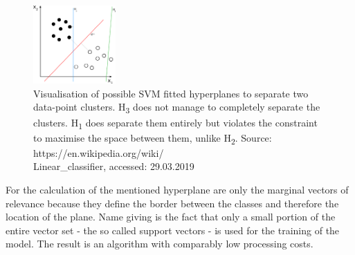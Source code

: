 \begin{figure} %
    \centerline{\includegraphics[trim={0 0 0 0},clip,width=0.28\textwidth]{img/Svm_separating_hyperplanes}}
  \caption{Visualisation of possible SVM fitted hyperplanes to separate two data-point clusters. H\textsubscript{3} does not manage to completely separate the clusters. H\textsubscript{1} does separate them entirely but violates the constraint to maximise the space between them, unlike H\textsubscript{2}. Source: https://en.wikipedia.org/wiki/ \\ Linear\_classifier, accessed: 29.03.2019}
  \label{fig:SVM_visualisation}
\vspace{-0.5cm}
\end{figure}

For the calculation of the mentioned hyperplane are only the marginal vectors of relevance because they define the border between the classes and therefore the location of the plane. Name giving is the fact that only a small portion of the entire vector set - the so called support vectors - is used for the training of the model. The result is an algorithm with comparably low processing costs.

